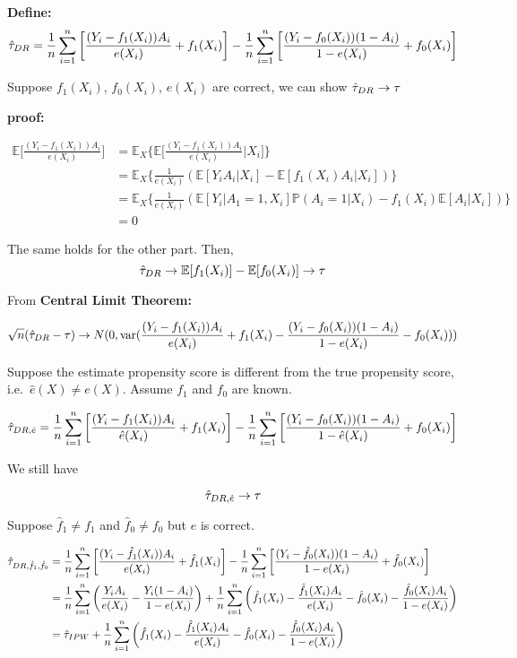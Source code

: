 \documentclass[
]{book}
\begin{document}
\textbf{Define:}
\[\hat{\Large\tau}_{DR} = \frac{1}{n}\sum_{i=1}^{n} \bigg[\frac{(Y_i - f_1(X_i))A_i}{e(X_i)} + f_1(X_i)\bigg] - \frac{1}{n}\sum_{i=1}^{n} \bigg[\frac{(Y_i - f_0(X_i))(1-A_i)}{1-e(X_i)} + f_0(X_i)\bigg]\]

Suppose \(f_1(X_i)\), \(f_0(X_i)\), \(e(X_i)\) are correct, we can show \(\hat{\Large\tau}_{DR} \rightarrow {\Large\tau}\)

\textbf{proof:}

\begin{align*}
\mathbb{E} \bigg[  \frac{(Y_i - f_1(X_i))A_i}{e(X_i)}\bigg] &= \mathbb{E}_X \bigg\{\mathbb{E} \bigg[  \frac{(Y_i - f_1(X_i))A_i}{e(X_i)}|X_i\bigg] \bigg\} \\
&= \mathbb{E}_X \bigg\{ \frac{1}{e(X_i)} (\mathbb{E}[Y_iA_i|X_i] - \mathbb{E}[f_1(X_i)A_i|X_i])  \bigg\} \\
&= \mathbb{E}_X \bigg\{ \frac{1}{e(X_i)} (\mathbb{E}[Y_i|A_1 = 1, X_i] \mathbb{P}(A_i=1|X_i) - f_1(X_i)\mathbb{E}[A_i|X_i])  \bigg\} \\
&=0
\end{align*}

The same holds for the other part. Then,
\[\hat{\Large\tau}_{DR} \rightarrow \mathbb{E}[f_1(X_i)]-\mathbb{E}[f_0(X_i)]\rightarrow {\Large\tau}\]

From \textbf{Central Limit Theorem:}

\[\sqrt{n}(\hat{\Large\tau}_{DR} - {\Large \tau}) \rightarrow N(0, \text{var}(\frac{(Y_i - f_1(X_i))A_i}{e(X_i)} + f_1(X_i) -\frac{(Y_i - f_0(X_i))(1-A_i)}{1-e(X_i)} - f_0(X_i)))\]

Suppose the estimate propensity score is different from the true propensity score, i.e.~\(\hat{e}(X) \neq e(X)\). Assume \(f_1\) and \(f_0\) are known.

\[\hat{\Large\tau}_{DR,\hat{e}} = \frac{1}{n}\sum_{i=1}^{n} \bigg[\frac{(Y_i - f_1(X_i))A_i}{\hat e(X_i)} + f_1(X_i)\bigg] - \frac{1}{n}\sum_{i=1}^{n} \bigg[\frac{(Y_i - f_0(X_i))(1-A_i)}{1-\hat e(X_i)} + f_0(X_i)\bigg]\]

We still have

\[\hat{\Large\tau}_{DR,\hat{e}} \rightarrow {\Large\tau}\]

Suppose \(\hat f_1 \neq f_1\) and \(\hat f_0 \neq f_0\) but \(e\) is correct.

\begin{align*}
\hat{\Large\tau}_{DR,\hat{f}_1,\hat{f}_0} &= \frac{1}{n}\sum_{i=1}^{n} \bigg[\frac{(Y_i - \hat f_1(X_i))A_i}{ e(X_i)} + \hat f_1(X_i)\bigg] - \frac{1}{n}\sum_{i=1}^{n} \bigg[\frac{(Y_i - \hat f_0(X_i))(1-A_i)}{1-e(X_i)} + \hat f_0(X_i)\bigg] \\
&= \frac{1}{n} \sum_{i=1}^{n} \bigg(\frac{Y_iA_i}{e(X_i)} - \frac{Y_i(1-A_i)}{1-e(X_i)}\bigg) + \frac{1}{n} \sum_{i=1}^{n} \bigg(\hat f_1(X_i) - \frac{\hat f_1(X_i)A_i}{e(X_i)} - \hat f_0(X_i) - \frac{\hat f_0(X_i)A_i}{1-e(X_i)}\bigg)\\ 
&= \hat{\Large\tau}_{IPW} + \frac{1}{n} \sum_{i=1}^{n} \bigg(\hat f_1(X_i) - \frac{\hat f_1(X_i)A_i}{e(X_i)} - \hat f_0(X_i) - \frac{\hat f_0(X_i)A_i}{1-e(X_i)}\bigg)
\end{align*}
\end{document}
